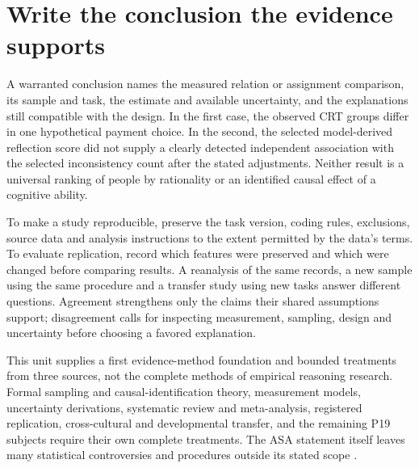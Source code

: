 \section{Write the conclusion the evidence supports}
\label{sec:p19-warranted-conclusion}

A warranted conclusion names the measured relation or assignment comparison,
its sample and task, the estimate and available uncertainty, and the explanations
still compatible with the design. In the first case, the observed CRT groups
differ in one hypothetical payment choice. In the second, the selected
model-derived reflection score did not supply a clearly detected independent
association with the selected inconsistency count after the stated adjustments. Neither result
is a universal ranking of people by rationality or an identified causal effect
of a cognitive ability.

To make a study reproducible, preserve the task version, coding rules,
exclusions, source data and analysis instructions to the extent permitted by
the data's terms. To evaluate replication, record which features were preserved
and which were changed before comparing results. A reanalysis of the same
records, a new sample using the same procedure and a transfer study using new
tasks answer different questions. Agreement strengthens only the claims their
shared assumptions support; disagreement calls for inspecting measurement,
sampling, design and uncertainty before choosing a favored explanation.

This unit supplies a first evidence-method foundation and bounded treatments
from three sources, not the complete methods of empirical reasoning research.
Formal sampling and causal-identification theory, measurement models,
uncertainty derivations, systematic review and meta-analysis, registered
replication, cross-cultural and developmental transfer, and the remaining P19
subjects require their own complete treatments. The ASA statement itself leaves
many statistical controversies and procedures outside its stated scope
\cite[pp.~130--132]{WassersteinLazar2016ASA}.
